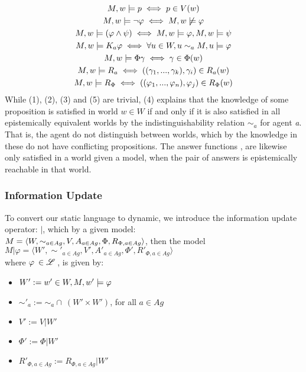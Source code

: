 \begin{gather}
	M, w |= p \iff p \in V(w) \\
	M, w |= \neg\varphi \iff M, w \not\models \varphi\\
	M, w |= (\varphi \land \psi) \iff M, w |= \varphi, M, w |= \psi \\
	M, w |= K_a\varphi \iff \forall u\in W, u \sim_{a} M, u |= \varphi \\
	M, w |= \Phi\gamma \iff \gamma \in \Phi(w) \\
	M, w |= R_a \iff ((\gamma_1,...,\gamma_k), \gamma_i) \in R_a(w) \\
	M, w |= R_\Phi \iff ((\varphi_1,...,\varphi_n), \varphi_j) \in R_\Phi(w)
\end{gather}
While (1), (2), (3) and (5) are trivial, (4) explains that the knowledge of some proposition \proposition is satisfied in world $w \in W$ if and only if it is also satisfied in all epistemically equivalent worlds by the indistinguishability relation $\sim_a$ for agent \textit{a}. That is, the agent do not distinguish between worlds, which by the knowledge in these do not have conflicting propositions. The answer functions \anso, \ansa are likewise only satisfied in a world given a model, when the pair of answers is epistemically reachable in that world. 
\subsubsection*{Information Update}
To convert our static language to dynamic, we introduce the information update operator: $|$, which by a given model: \\$M = \langle W, \sim_{a\in Ag}, V, A_{a\in Ag}, \Phi, R_{\Phi, a\in Ag}\rangle$, then the model $M|\varphi = \langle W', \sim'_{a\in Ag}, V', A'_{a\in Ag}, \Phi', R'_{\Phi, a\in Ag}\rangle$\\ where $\varphi\: \in \mathscr{L} \:$, is given by:

\begin{itemize}
	\item $W' := w' \in W,  M, w' \models \varphi\:$
	\item $\sim'_a := \sim_a \cap \:(W' \times W')$, for all $a \in Ag$
	\item $V' := V | W'$
	\item $\Phi' := \Phi | W'$
	\item $R'_{\Phi, a\in Ag} := R_{\Phi, a\in Ag} | W'$ 
\end{itemize}
